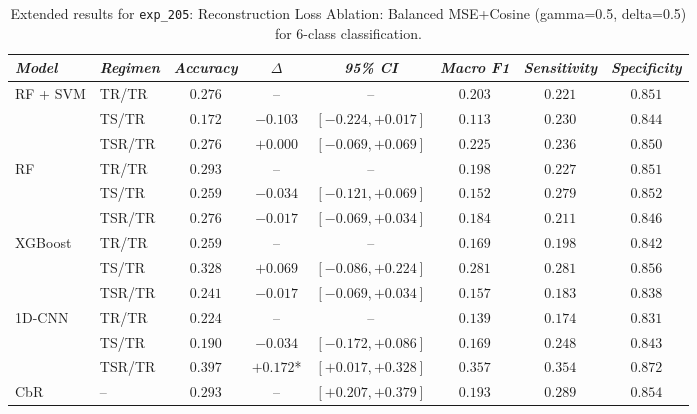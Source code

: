 \begin{table}[H]
\centering
\scriptsize
\caption{Extended results for \texttt{exp\_205}: Reconstruction Loss Ablation: Balanced MSE+Cosine (gamma=0.5, delta=0.5) for 6-class classification.}
\label{tab:appendix_exp_205}
\begin{tabular*}{\textwidth}{@{\extracolsep{\fill}}llcccccc}
\toprule
\emph{Model} & \emph{Regimen} & \emph{Accuracy} & \emph{$\Delta$} & \emph{95\% CI} & \emph{Macro F1} & \emph{Sensitivity} & \emph{Specificity}\\
\midrule
\multirow{3}{*}{RF + SVM} & TR/TR & $0.276$ & -- & -- & $0.203$ & $0.221$ & $0.851$\\
 & TS/TR & $0.172$ & $-0.103$ & $[-0.224, +0.017]$ & $0.113$ & $0.230$ & $0.844$\\
 & TSR/TR & $0.276$ & $+0.000$ & $[-0.069, +0.069]$ & $0.225$ & $0.236$ & $0.850$\\
\midrule
\multirow{3}{*}{RF} & TR/TR & $0.293$ & -- & -- & $0.198$ & $0.227$ & $0.851$\\
 & TS/TR & $0.259$ & $-0.034$ & $[-0.121, +0.069]$ & $0.152$ & $0.279$ & $0.852$\\
 & TSR/TR & $0.276$ & $-0.017$ & $[-0.069, +0.034]$ & $0.184$ & $0.211$ & $0.846$\\
\midrule
\multirow{3}{*}{XGBoost} & TR/TR & $0.259$ & -- & -- & $0.169$ & $0.198$ & $0.842$\\
 & TS/TR & $0.328$ & $+0.069$ & $[-0.086, +0.224]$ & $0.281$ & $0.281$ & $0.856$\\
 & TSR/TR & $0.241$ & $-0.017$ & $[-0.069, +0.034]$ & $0.157$ & $0.183$ & $0.838$\\
\midrule
\multirow{3}{*}{1D-CNN} & TR/TR & $0.224$ & -- & -- & $0.139$ & $0.174$ & $0.831$\\
 & TS/TR & $0.190$ & $-0.034$ & $[-0.172, +0.086]$ & $0.169$ & $0.248$ & $0.843$\\
 & TSR/TR & $0.397$ & $+0.172$* & $[+0.017, +0.328]$ & $0.357$ & $0.354$ & $0.872$\\
\midrule
CbR & -- & $0.293$ & -- & $[+0.207, +0.379]$ & $0.193$ & $0.289$ & $0.854$\\
\bottomrule
\end{tabular*}
\end{table}

